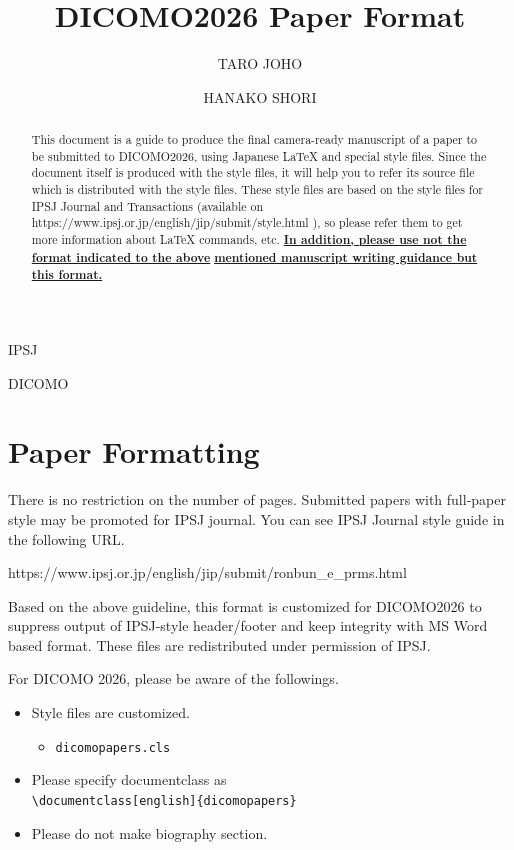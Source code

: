 \documentclass[English]{dicomopapers}
\def\|{\verb|}
\begin{document}
\title{DICOMO2026 Paper Format}



\author{TARO JOHO}{IPSJ}
\author{HANAKO SHORI}{DICOMO}

\begin{abstract}
  This document is a guide to produce the final camera-ready manuscript
  of a paper to be submitted to DICOMO2026, using Japanese {\LaTeX} and
  special style files. Since the document itself is produced with the
  style files, it will help you to refer its source file which is
  distributed with the style files. These style files are based on the
  style files for IPSJ Journal and Transactions (available on
  https://www.ipsj.or.jp/english/jip/submit/style.html ), so please refer
  them to get more information about {\LaTeX} commands, etc.
    {\bf \underline{In addition, please use not the format indicated to the
        above}}
    {\bf \underline{mentioned manuscript writing guidance but this format. }}
\end{abstract}

\maketitle

%1
\section{Paper Formatting}
There is no restriction on the number of pages. Submitted papers
with full-paper style may be promoted for IPSJ journal.
You can see IPSJ Journal style guide in
the following URL\cite{webpage}.

\noindent
https://www.ipsj.or.jp/english/jip/submit/ronbun\_e\_prms.html

Based on the above guideline, this format is customized for DICOMO2026
to suppress output of IPSJ-style header/footer and keep integrity with
MS Word based format.
These files are redistributed under permission of IPSJ.

For DICOMO 2026, please be aware of the followings.
\begin{itemize}
  \item Style files are customized.
        \begin{itemize}%{
          \item[]\tt dicomopapers.cls
        \end{itemize}%}
  \item Please specify documentclass as\\
        \|\documentclass[english]{dicomopapers}|
  \item Please do not make biography section.
\end{itemize}
\end{document}
